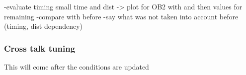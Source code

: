 -evaluate timing small time and dist ->  plot for OB2 with  and then values for remaining %
-compare with before
-say what was not taken into account before (timing, dist dependency)

\subsubsection{Cross talk tuning}

This will come after the conditions are updated
